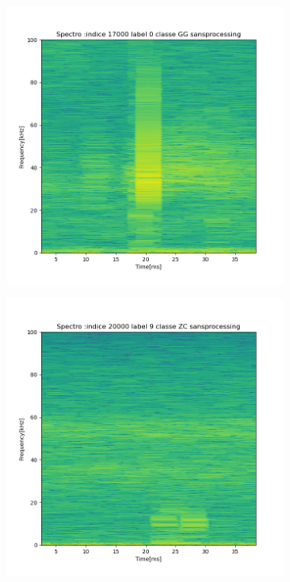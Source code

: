 \begin{figure}[!h]
  \centering
  \begin{subfigure}[b]{0.3\textwidth}
    \includegraphics[width=\textwidth]{./images/indice17000Spectro2Dlabel0classeGGsansprocessingsanszoom.png}
  \end{subfigure}
  \begin{subfigure}[b]{0.3\textwidth}
    \includegraphics[width=\textwidth]{./images/indice20000Spectro2Dlabel9classeZCsansprocessingsanszoom.png}

\end{subfigure}
\end{figure}
